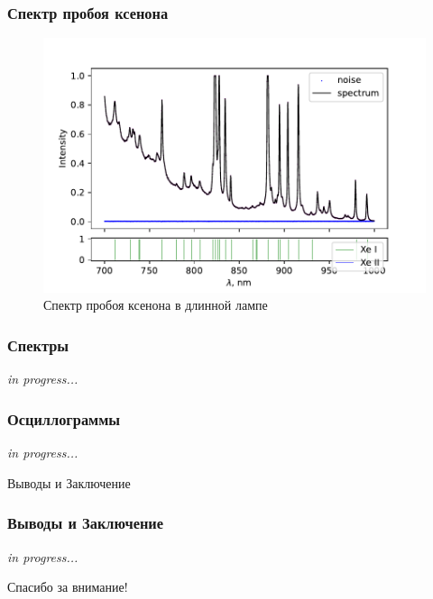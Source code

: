 \documentclass{beamer}
\begin{document}
	\begin{frame}
		\frametitle{Спектр пробоя ксенона}
		\begin{figure}
			\centering
			\includegraphics[width=\linewidth]{gen/xe_lines.pdf}
			\caption*{Спектр пробоя ксенона в длинной лампе}
		\end{figure}
	\end{frame}

	\begin{frame}
		\frametitle{Спектры}
		
		\begin{center}
			\huge {} \textit{in progress...}
		\end{center}
		
	\end{frame}

	\begin{frame}
		\frametitle{Осциллограммы}
		
		\begin{center}
			\huge {} \textit{in progress...}
		\end{center}
		
	\end{frame}

	\begin{frame}[plain,c]
		
		\begin{center}
			\huge {} Выводы и Заключение
		\end{center}
		
	\end{frame}
	
	\begin{frame}
		\frametitle{Выводы и Заключение}
		
		\begin{center}
			\huge {} \textit{in progress...}
		\end{center}
		
	\end{frame}
	

	\begin{frame}[plain,c]
		
		\begin{center}
			\huge {} Спасибо за внимание!
		\end{center}
		
	\end{frame}
	
\end{document}
